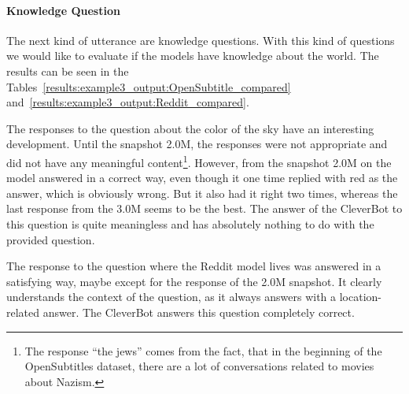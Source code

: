 \paragraph{Knowledge Question}
The next kind of utterance are knowledge questions. With this kind of questions we would like to evaluate if the models have knowledge about the world. The results can be seen in the Tables~\ref{results:example3_output:OpenSubtitle_compared} and~\ref{results:example3_output:Reddit_compared}.

The responses to the question about the color of the sky have an interesting development. Until the snapshot 2.0M, the responses were not appropriate and did not have any meaningful content\footnote{The response ``the jews'' comes from the fact, that in the beginning of the OpenSubtitles dataset, there are a lot of conversations related to movies about Nazism.}. However, from the snapshot 2.0M on the model answered in a correct way, even though it one time replied with red as the answer, which is obviously wrong. But it also had it right two times, whereas the last response from the 3.0M seems to be the best. The answer of the CleverBot to this question is quite meaningless and has absolutely nothing to do with the provided question.

The response to the question where the Reddit model lives was answered in a satisfying way, maybe except for the response of the 2.0M snapshot. It clearly understands the context of the question, as it always answers with a location-related answer. The CleverBot answers this question completely correct.

